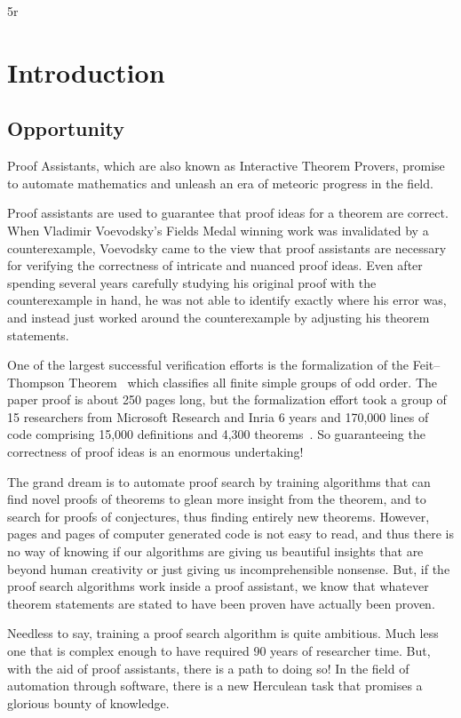 5r\documentclass{article}
\theoremstyle{definition}
\begin{document}
\clearpage

\section{Introduction}
\subsection{Opportunity}
Proof Assistants, which are also known as Interactive Theorem Provers, promise to automate mathematics and unleash an era of meteoric progress in the field.

Proof assistants are used to guarantee that proof ideas for a theorem are correct. When Vladimir Voevodsky's Fields Medal winning work was invalidated by a counterexample, Voevodsky came to the view that proof assistants are necessary for verifying the correctness of intricate and nuanced proof ideas. Even after spending several years carefully studying his original proof with the counterexample in hand, he was not able to identify exactly where his error was, and instead just worked around the counterexample by adjusting his theorem statements. 

One of the largest successful verification efforts is the formalization of the Feit--Thompson Theorem~\cite{Gonthier2013} which classifies all finite simple groups of odd order. The paper proof is about 250 pages long, but the formalization effort took a group of 15 researchers from Microsoft Research and Inria 6 years and 170,000 lines of code comprising 15,000 definitions and 4,300 theorems~\cite{Knies2012}. So guaranteeing the correctness of proof ideas is an enormous undertaking!

The grand dream is to automate proof search by training algorithms that can find novel proofs of theorems to glean more insight from the theorem, and to search for proofs of conjectures, thus finding entirely new theorems. However, pages and pages of computer generated code is not easy to read, and thus there is no way of knowing if our algorithms are giving us beautiful insights that are beyond human creativity or just giving us incomprehensible nonsense. But, if the proof search algorithms work inside a proof assistant, we know that whatever theorem statements are stated to have been proven have actually been proven.

Needless to say, training a proof search algorithm is quite ambitious. Much less one that is complex enough to have required 90 years of researcher time. But, with the aid of proof assistants, there is a path to doing so! In the field of automation through software, there is a new Herculean task that promises a glorious bounty of knowledge.
\end{document}
